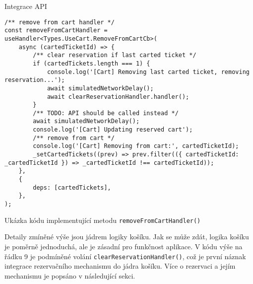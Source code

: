 \begin{subsection}{Integrace API}
    \begin{listing}[H]
        \begin{verbatim}
/** remove from cart handler */
const removeFromCartHandler = useHandler<Types.UseCart.RemoveFromCartCb>(
	async (cartedTicketId) => {
		/** clear reservation if last carted ticket */
		if (cartedTickets.length === 1) {
			console.log('[Cart] Removing last carted ticket, removing reservation...');
			await simulatedNetworkDelay();
			await clearReservationHandler.handler();
		}
		/** TODO: API should be called instead */
		await simulatedNetworkDelay();
		console.log('[Cart] Updating reserved cart');
		/** remove from cart */
		console.log('[Cart] Removing from cart:', cartedTicketId);
		_setCartedTickets((prev) => prev.filter(({ cartedTicketId: _cartedTicketId }) => _cartedTicketId !== cartedTicketId));
	},
	{
		deps: [cartedTickets],
	},
);
        \end{verbatim}
        \caption{Ukázka kódu implementující metodu \texttt{removeFromCartHandler()}}
        \label{lst:remove-from-cart-handler}
    \end{listing}

    Detaily zmíněné výše jsou jádrem logiky košíku.
    Jak se může zdát, logika košíku je poměrně jednoduchá, ale je zásadní pro funkčnost aplikace.
    V kódu výše na řádku 9 je podmíněné volání \texttt{clearReservationHandler()}, což je první náznak integrace rezervačního mechanismu do jádra košíku.
    Více o rezervaci a jejím mechanismu je popsáno v následující sekci.
\end{subsection}

